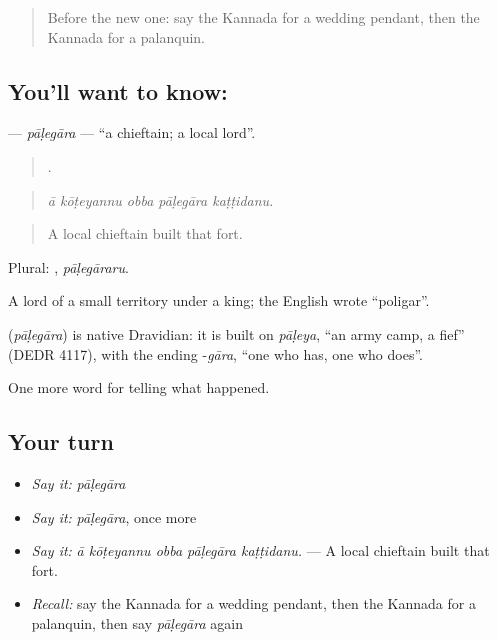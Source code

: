\label{lesson:KA-C371-palegara}



\begin{quote}
Before the new one: say the Kannada for a wedding pendant, then the Kannada for a palanquin.
\end{quote}

\subsection*{You'll want to know: }
\textbf{} — \emph{pāḷegāra} — \textquotedblleft{}a chieftain; a local lord\textquotedblright{}.

\begin{quote}
    .
\end{quote}

\begin{quote}
\emph{ā kōṭeyannu obba pāḷegāra kaṭṭidanu.}
\end{quote}

\begin{quote}
A local chieftain built that fort.
\end{quote}

Plural: , \emph{pāḷegāraru}.

A lord of a small territory under a king; the English wrote \textquotedblleft{}poligar\textquotedblright{}.

\begin{cousinweb}
\textbf{} (\emph{pāḷegāra}) is native Dravidian: it is built on \emph{pāḷeya}, \textquotedblleft{}an army camp, a fief\textquotedblright{} (DEDR 4117), with the ending -\emph{gāra}, \textquotedblleft{}one who has, one who does\textquotedblright{}.
\end{cousinweb}

\begin{grammarlens}[title={What you've built}]
One more word for telling what happened.
\end{grammarlens}

\subsection*{Your turn}
\begin{itemize}
\raggedright
  \item \emph{Say it:} \emph{pāḷegāra}
  \item \emph{Say it:} \emph{pāḷegāra}, once more
  \item \emph{Say it:} \emph{ā kōṭeyannu obba pāḷegāra kaṭṭidanu.} — A local chieftain built that fort.
  \item \emph{Recall:} say the Kannada for a wedding pendant, then the Kannada for a palanquin, then say \emph{pāḷegāra} again
\end{itemize}

